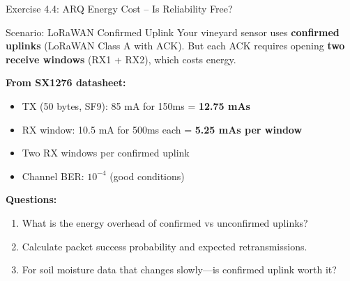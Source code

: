\documentclass[aspectratio=169,11pt]{beamer}
\begin{document}
\begin{frame}{Exercise 4.4: ARQ Energy Cost -- Is Reliability Free?}
    \begin{block}{Scenario: LoRaWAN Confirmed Uplink}
        Your vineyard sensor uses \textbf{confirmed uplinks} (LoRaWAN Class A with ACK). But each ACK requires opening \textbf{two receive windows} (RX1 + RX2), which costs energy.
        
        \vspace{0.2cm}
        \textbf{From SX1276 datasheet:}
        \begin{itemize}
            \item TX (50 bytes, SF9): 85 mA for 150ms = \textbf{12.75 mAs}
            \item RX window: 10.5 mA for 500ms each = \textbf{5.25 mAs per window}
            \item Two RX windows per confirmed uplink
            \item Channel BER: $10^{-4}$ (good conditions)
        \end{itemize}
    \end{block}
    
    \textbf{Questions:}
    \begin{enumerate}
        \item What is the energy overhead of confirmed vs unconfirmed uplinks?
        \item Calculate packet success probability and expected retransmissions.
        \item For soil moisture data that changes slowly---is confirmed uplink worth it?
    \end{enumerate}
\end{frame}
\end{document}
